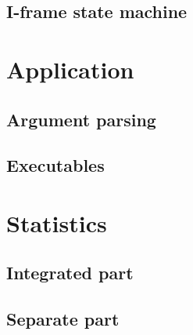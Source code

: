 \documentclass[a4paper, 11pt]{report}
\begin{document}
\subsection{I-frame state machine}



\section{Application}



\subsection{Argument parsing}



\subsection{Executables}



\section{Statistics}
\subsection{Integrated part}



\subsection{Separate part}


\end{document}
